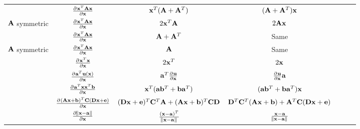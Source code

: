 \begin{center}
\begin{tabular}{l|Sc|Sc|Sc}
                           & $\pd{\vx^T\mA\vx}{\vx}$                       & $\vx^T(\mA+\mA^T)$                                 & $(\mA+\mA^T)\vx$                              \\
$\mA$ symmetric            & $\pd{\vx^T\mA\vx}{\vx}$                       & $2\vx^T\mA$                                        & $2\mA\vx$                                     \\
                           & $\pd{\vx^T\mA\vx}{\vx}$                       & $\mA+\mA^T$                                        & Same                                          \\
$\mA$ symmetric            & $\pd{\vx^T\mA\vx}{\vx}$                       & $\mA$                                              & Same                                          \\
                           & $\pd{\vx^T\vx}{\vx}$                          & $2\vx^T$                                           & $2\vx$                                        \\
                           & $\pd{\va^T\vu(\vx)}{\vx}$                     & $\va^T\pd{\vu}{\vx}$                               & $\pd{\vu}{\vx}\va$                            \\
                           & $\pd{\va^T\vx\vx^T\vb}{\vx}$                  & $\vx^T(\va\vb^T+\vb\va^T)$                         & $(\va\vb^T+\vb\va^T)\vx$                      \\
                           & $\pd{(\mA\vx+\vb)^T\mC(\mD\vx+\ve)}{\vx}$     & $(\mD\vx+\ve)^T\mC^T\mA+(\mA\vx+\vb)^T\mC\mD$      & $\mD^T\mC^T(\mA\vx+\vb)+\mA^T\mC(\mD\vx+\ve)$ \\
                           & $\pd{\norm{\vx-\va}}{\vx}$                    & $\frac{(\vx-\va)^T}{\norm{\vx-\va}}$               & $\frac{\vx-\va}{\norm{\vx-\va}}$              \\                           
\end{tabular}
\end{center}

